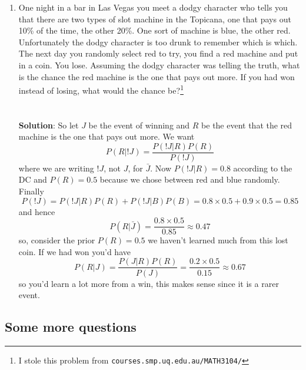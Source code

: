 \documentclass[11pt,a4paper]{scrartcl}
\begin{document}
\begin{enumerate}
  
\item One night in a bar in Las Vegas you meet a dodgy character who
  tells you that there are two types of slot machine in the Topicana,
  one that pays out 10\% of the time, the other 20\%. One sort of
  machine is blue, the other red. Unfortunately the dodgy character is
  too drunk to remember which is which. The next day you randomly
  select red to try, you find a red machine and put in a coin. You
  lose. Assuming the dodgy character was telling the truth, what is
  the chance the red machine is the one that pays out more. If you had
  won instead of losing, what would the chance be?\footnote{I stole
    this problem from \texttt{courses.smp.uq.edu.au/MATH3104/}}
\\ \\ \\ \textbf{Solution}:
  So let $J$ be the event of winning and $R$ be the event that the red
  machine is the one that pays out more. We want
\begin{equation}
P(R|!J)=\frac{P(!J|R)P(R)}{P(!J)}
\end{equation}
where we are writing $!J$, not $J$, for $\bar{J}$. Now $P(!J|R)=0.8$
according to the DC and $P(R)=0.5$ because we chose between red and
blue randomly. Finally
\begin{equation}
P(!J)=P(!J|R)P(R)+P(!J|B)P(B)=0.8\times 0.5 + 0.9\times 0.5=0.85
\end{equation}
and hence
\begin{equation}
P(R|\bar{J})=\frac{0.8\times 0.5}{0.85}\approx0.47
\end{equation}
so, consider the prior $P(R)=0.5$ we haven't learned much from this lost coin. If we had won you'd have
\begin{equation}
P(R|J)=\frac{P(J|R)P(R)}{P(J)}=\frac{0.2\times 0.5}{0.15}\approx 0.67
\end{equation}
so you'd learn a lot more from a win, this makes sense since it is a rarer event.
\end{enumerate}

  
\subsection*{Some more questions}
\end{document}

